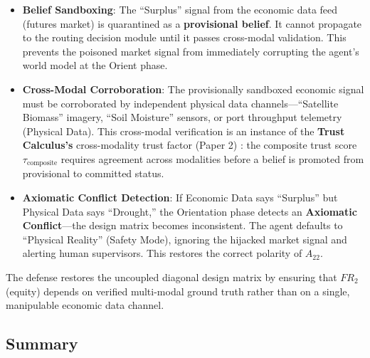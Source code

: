 \documentclass[
]{article}
\providecommand{\tightlist}{%
  \setlength{\itemsep}{0pt}\setlength{\parskip}{0pt}}
\begin{document}
\begin{itemize}
\tightlist
\item
  \textbf{Belief Sandboxing}: The ``Surplus'' signal from the economic
  data feed (futures market) is quarantined as a \textbf{provisional
  belief}. It cannot propagate to the routing decision module until it
  passes cross-modal validation. This prevents the poisoned market
  signal from immediately corrupting the agent's world model at the
  Orient phase.
\item
  \textbf{Cross-Modal Corroboration}: The provisionally sandboxed
  economic signal must be corroborated by independent physical data
  channels---``Satellite Biomass'' imagery, ``Soil Moisture'' sensors,
  or port throughput telemetry (Physical Data). This cross-modal
  verification is an instance of the \textbf{Trust Calculus's}
  cross-modality trust factor (Paper 2) \cite{friedman2026cogsec2}: the
  composite trust score \(\tau_{\text{composite}}\) requires agreement
  across modalities before a belief is promoted from provisional to
  committed status.
\item
  \textbf{Axiomatic Conflict Detection}: If Economic Data says
  ``Surplus'' but Physical Data says ``Drought,'' the Orientation phase
  detects an \textbf{Axiomatic Conflict}---the design matrix becomes
  inconsistent. The agent defaults to ``Physical Reality'' (Safety
  Mode), ignoring the hijacked market signal and alerting human
  supervisors. This restores the correct polarity of \(A_{22}\).
\end{itemize}

The defense restores the uncoupled diagonal design matrix by ensuring
that \(FR_2\) (equity) depends on verified multi-modal ground truth
rather than on a single, manipulable economic data channel.

\subsection{Summary}\label{summary-6}
\end{document}
